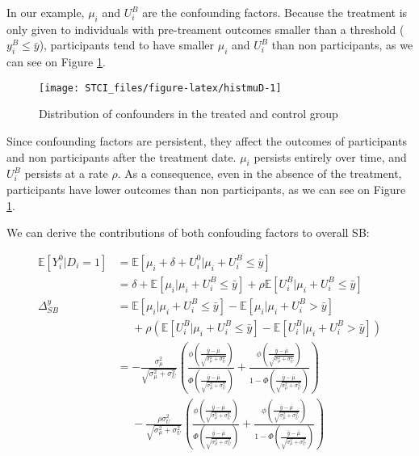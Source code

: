\documentclass[]{book}
\newcommand{\esp}[1]{\mathbb{E}[ #1 ]}
\theoremstyle{definition}
\theoremstyle{definition}
\theoremstyle{definition}
\theoremstyle{remark}
\let\BeginKnitrBlock\begin \let\EndKnitrBlock\end
\begin{document}
\BeginKnitrBlock{example}
\protect\hypertarget{exm:unnamed-chunk-19}{}{\label{exm:unnamed-chunk-19} }In our example, \(\mu_i\) and \(U_i^B\) are the confounding factors.
Because the treatment is only given to individuals with pre-treament outcomes smaller than a threshold (\(y_i^B\leq\bar{y}\)), participants tend to have smaller \(\mu_i\) and \(U_i^B\) than non participants, as we can see on Figure \ref{fig:histmuD}.
\EndKnitrBlock{example}

\begin{figure}[htbp]

{\centering \texttt{[image: STCI\_files/figure-latex/histmuD-1]} 

}

\caption{Distribution of confounders in the treated and control group}\label{fig:histmuD}
\end{figure}

Since confounding factors are persistent, they affect the outcomes of participants and non participants after the treatment date.
\(\mu_i\) persists entirely over time, and \(U_i^B\) persists at a rate \(\rho\).
As a consequence, even in the absence of the treatment, participants have lower outcomes than non participants, as we can see on Figure \ref{fig:histmuD}.

We can derive the contributions of both confouding factors to overall SB:

\begin{align*}
\esp{Y_i^0|D_i=1} & = \esp{\mu_i+\delta+U_i^0|\mu_i+U_i^B\leq\bar{y}}\\
                  & = \delta + \esp{\mu_i|\mu_i+U_i^B\leq\bar{y}} + \rho\esp{U_i^B|\mu_i+U_i^B\leq\bar{y}}\\
\Delta^y_{SB}     & = \esp{\mu_i|\mu_i+U_i^B\leq\bar{y}}-\esp{\mu_i|\mu_i+U_i^B>\bar{y}} \\
                  & \phantom{=} + \rho\left(\esp{U_i^B|\mu_i+U_i^B\leq\bar{y}}-\esp{U_i^B|\mu_i+U_i^B>\bar{y}}\right)\\
                  & = -\frac{\sigma^2_{\mu}}{\sqrt{\sigma^2_{\mu}+\sigma^2_{U}}}\left(\frac{\phi\left(\frac{\bar{y}-\bar{\mu}}{\sqrt{\sigma^2_{\mu}+\sigma^2_{U}}}\right)}{\Phi\left(\frac{\bar{y}-\bar{\mu}}{\sqrt{\sigma^2_{\mu}+\sigma^2_{U}}}\right)}+\frac{\phi\left(\frac{\bar{y}-\bar{\mu}}{\sqrt{\sigma^2_{\mu}+\sigma^2_{U}}}\right)}{1-\Phi\left(\frac{\bar{y}-\bar{\mu}}{\sqrt{\sigma^2_{\mu}+\sigma^2_{U}}}\right)}\right) \\
                  & \phantom{=} -\frac{\rho\sigma^2_{U}}{\sqrt{\sigma^2_{\mu}+\sigma^2_{U}}}\left(\frac{\phi\left(\frac{\bar{y}-\bar{\mu}}{\sqrt{\sigma^2_{\mu}+\sigma^2_{U}}}\right)}{\Phi\left(\frac{\bar{y}-\bar{\mu}}{\sqrt{\sigma^2_{\mu}+\sigma^2_{U}}}\right)}+\frac{\phi\left(\frac{\bar{y}-\bar{\mu}}{\sqrt{\sigma^2_{\mu}+\sigma^2_{U}}}\right)}{1-\Phi\left(\frac{\bar{y}-\bar{\mu}}{\sqrt{\sigma^2_{\mu}+\sigma^2_{U}}}\right)}\right)
\end{align*}
\end{document}
